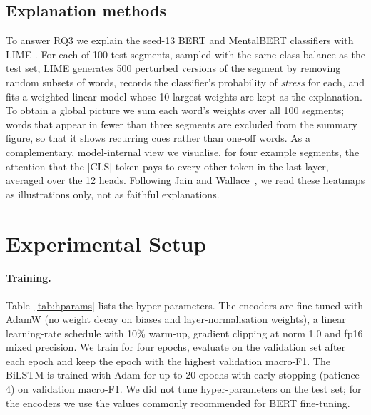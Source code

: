 \subsection{Explanation methods}
To answer RQ3 we explain the seed-13 BERT and MentalBERT classifiers with LIME
\cite{ribeiro2016lime}. For each of 100 test segments, sampled with the same class balance as the
test set, LIME generates 500 perturbed versions of the segment by removing random subsets of words,
records the classifier's probability of \emph{stress} for each, and fits a weighted linear model whose
10 largest weights are kept as the explanation. To obtain a global picture we sum each word's weights
over all 100 segments; words that appear in fewer than three segments are excluded from the summary
figure, so that it shows recurring cues rather than one-off words. As a complementary, model-internal
view we visualise, for four example segments, the attention that the [CLS] token pays to every other
token in the last layer, averaged over the 12 heads. Following Jain and Wallace~, we read
these heatmaps as illustrations only, not as faithful explanations.

\section{Experimental Setup}
\label{sec:setup}
\paragraph{Training.} Table~\ref{tab:hparams} lists the hyper-parameters. The encoders are fine-tuned
with AdamW \cite{loshchilov2019decoupled} (no weight decay on biases and layer-normalisation weights),
a linear learning-rate schedule with 10\% warm-up, gradient clipping at norm 1.0 and fp16 mixed
precision. We train for four epochs, evaluate on the validation set after each epoch and keep the
epoch with the highest validation macro-F1. The BiLSTM is trained with Adam for up to 20 epochs with
early stopping (patience 4) on validation macro-F1. We did not tune hyper-parameters on the test set;
for the encoders we use the values commonly recommended for BERT fine-tuning.

